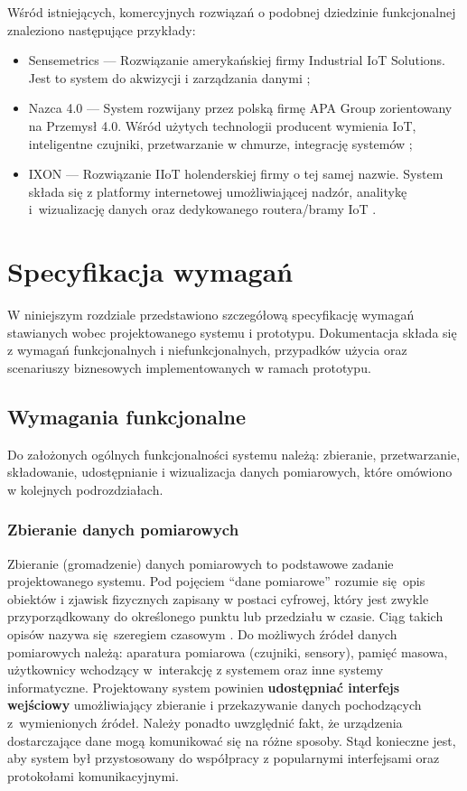 \documentclass[a4paper, 12pt, twoside]{article}
\begin{document}
Wśród istniejących, komercyjnych rozwiązań o podobnej dziedzinie funkcjonalnej
znaleziono następujące przykłady:
\begin{itemize}
      \itemsep0em
      \item Sensemetrics --- Rozwiązanie amerykańskiej firmy Industrial IoT Solutions.
            Jest to system do akwizycji i zarządzania danymi \cite{sensmetrics};
      \item Nazca 4.0 --- System rozwijany przez polską firmę APA Group zorientowany na Przemysł 4.0.
            Wśród użytych technologii producent wymienia IoT, inteligentne czujniki,
            przetwarzanie w chmurze, integrację systemów \cite{nazca};
      \item IXON --- Rozwiązanie IIoT holenderskiej firmy o tej samej nazwie.
            System składa się z platformy internetowej umożliwiającej nadzór, analitykę i~wizualizację danych oraz
            dedykowanego routera/bramy IoT \cite{ixon}.
\end{itemize}


\newpage
\section{Specyfikacja wymagań}\label{wymagania}

W niniejszym rozdziale przedstawiono szczegółową specyfikację wymagań
stawianych wobec projektowanego systemu i prototypu. Dokumentacja składa się
z wymagań funkcjonalnych i niefunkcjonalnych, przypadków użycia oraz scenariuszy
biznesowych implementowanych w ramach prototypu.

\subsection{Wymagania funkcjonalne}

Do założonych ogólnych funkcjonalności systemu należą: zbieranie, przetwarzanie,
składowanie, udostępnianie i wizualizacja danych pomiarowych, które omówiono
w kolejnych podrozdziałach.

\subsubsection{Zbieranie danych pomiarowych}

Zbieranie (gromadzenie) danych pomiarowych to podstawowe zadanie projektowanego systemu.
Pod pojęciem ``dane pomiarowe'' rozumie się opis obiektów i zjawisk fizycznych
zapisany w postaci cyfrowej, który jest zwykle przyporządkowany do określonego
punktu lub przedziału w czasie. Ciąg takich opisów nazywa się szeregiem czasowym \cite{time-series}.
Do możliwych źródeł danych pomiarowych należą: aparatura pomiarowa (czujniki, sensory),
pamięć masowa, użytkownicy wchodzący w~interakcję z systemem oraz inne systemy informatyczne.
Projektowany system powinien \textbf{udostępniać interfejs wejściowy} umożliwiający zbieranie
i przekazywanie danych pochodzących z~wymienionych źródeł. Należy ponadto uwzględnić
fakt, że urządzenia dostarczające dane mogą komunikować się na różne sposoby.
Stąd konieczne jest, aby system był przystosowany do współpracy z popularnymi
interfejsami oraz protokołami komunikacyjnymi.
\end{document}
